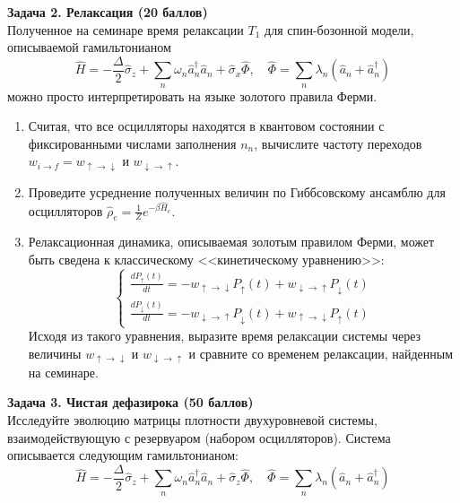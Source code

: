 \documentclass[12pt]{article}
\theoremstyle{definition}
\begin{document}
\textbf{Задача 2. Релаксация (20 баллов)}\\
Полученное на семинаре время релаксации $T_1$ для спин-бозонной модели, описываемой гамильтонианом
\begin{equation}
    \hat{H}=-\frac{\Delta}{2}\hat{\sigma}_z+\sum\limits_n\omega_n\hat{a}^\dagger_n\hat{a}_n+\hat{\sigma}_x\hat{\Phi},\quad \hat{\Phi}=\sum\limits_n\lambda_n(\hat{a}_n+\hat{a}^\dagger_n)
\end{equation}
можно просто интерпретировать на языке золотого правила Ферми.
\begin{enumerate}
    \item Считая, что все осцилляторы находятся в квантовом состоянии с фиксированными числами заполнения $n_n$, вычислите частоту переходов $w_{i\rightarrow f} = w_{\uparrow\rightarrow\downarrow}$ и $w_{\downarrow\rightarrow\uparrow}$.
    \item Проведите усреднение полученных величин по Гиббсовскому ансамблю для осцилляторов $\hat{\rho}_e =\frac{1}{Z}e^{-\beta\hat{H}_e}$.
    \item Релаксационная динамика, описываемая золотым правилом Ферми, может быть сведена к классическому <<кинетическому уравнению>>:
    \begin{equation}
        \begin{cases}
            \frac{dP_\uparrow(t)}{dt}=-w_{\uparrow\rightarrow\downarrow}P_\uparrow(t)+w_{\downarrow\rightarrow\uparrow}P_\downarrow(t)\\
            \frac{dP_\downarrow(t)}{dt}=-w_{\downarrow\rightarrow\uparrow}P_\downarrow(t)+w_{\uparrow\rightarrow\downarrow}P_\uparrow(t)
        \end{cases}
    \end{equation}
    Исходя из такого уравнения, выразите время релаксации системы через величины $w_{\uparrow\rightarrow\downarrow}$ и $w_{\downarrow\rightarrow\uparrow}$ и сравните со временем релаксации, найденным на семинаре.
\end{enumerate}
\textbf{Задача 3. Чистая дефазирока (50 баллов)}\\
Исследуйте эволюцию матрицы плотности двухуровневой системы, взаимодействующую с резервуаром (набором осцилляторов). Система описывается следующим гамильтонианом:
\begin{equation}
    \hat{H}=-\frac{\Delta}{2}\hat{\sigma}_z+\sum\limits_n\omega_n\hat{a}_n^\dagger\hat{a}_n+\hat{\sigma}_z\hat{\Phi},\quad\hat{\Phi}=\sum\limits_n\lambda_n(\hat{a}_n+\hat{a}^\dagger_n)
\end{equation}
\end{document}
